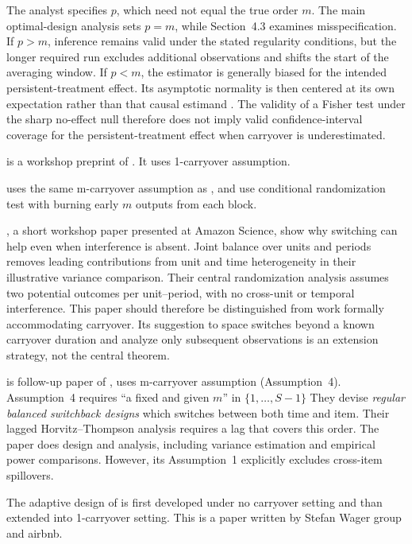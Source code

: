 \documentclass[12pt]{article}
\begin{document}
The analyst specifies $p$, which need not equal the true order $m$. The main optimal-design analysis sets $p=m$, while Section~4.3 examines misspecification. If $p>m$, inference remains valid under the stated regularity conditions, but the longer required run excludes additional observations and shifts the start of the averaging window. If $p<m$, the estimator is generally biased for the intended persistent-treatment effect. Its asymptotic normality is then centered at its own expectation rather than that causal estimand \citep[p.~3768]{bojinov2023}. The validity of a Fisher test under the sharp no-effect null therefore does not imply valid confidence-interval coverage for the persistent-treatment effect when carryover is underestimated.

\citet{ni2022} is a workshop preprint of \cite{bojinov2023}. It uses 1-carryover assumption.

\cite{liuzhong2026} uses the same m-carryover assumption as \cite{bojinov2023}, and use conditional randomization test with burning early $m$ outputs from each block. 

 

\citet{masoero2023}, a short workshop paper presented at Amazon Science, show why switching can help even when interference is absent. Joint balance over units and periods removes leading contributions from unit and time heterogeneity in their illustrative variance comparison. Their central randomization analysis assumes two potential outcomes per unit--period, with no cross-unit or temporal interference. This paper should therefore be distinguished from work formally accommodating carryover. Its suggestion to space switches beyond a known carryover duration and analyze only subsequent observations is an extension strategy, not the central theorem.

\citet{missault2025} is follow-up paper of \citet{masoero2023}, uses m-carryover assumption (Assumption~4). Assumption~4  requires ``a fixed and given $m$'' in $\{1,\ldots,S-1\}$  They devise \emph{regular balanced switchback designs} which switches between both time and item. Their lagged Horvitz--Thompson analysis requires a lag that covers this order. The paper does design and analysis, including variance estimation and empirical power comparisons. However, its Assumption~1 explicitly excludes cross-item spillovers.  


The adaptive design of \citet{zeng2026} is first developed under no carryover setting and than extended into 1-carryover setting. This is a paper written by Stefan Wager group and airbnb.
  
\end{document}
